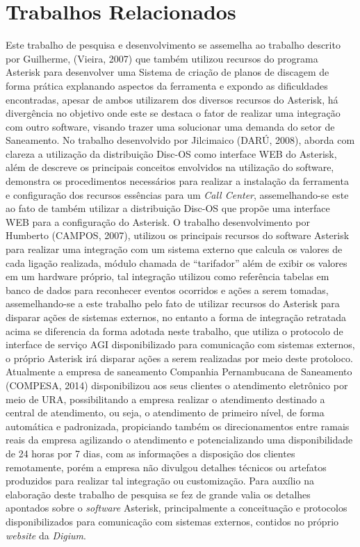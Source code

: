 \section{Trabalhos Relacionados}
Este trabalho de pesquisa e desenvolvimento se assemelha ao trabalho descrito por Guilherme, (Vieira, 2007) que também utilizou recursos do programa Asterisk para desenvolver uma Sistema de criação de planos de discagem de forma prática explanando aspectos da ferramenta e expondo as dificuldades encontradas, apesar de ambos utilizarem dos diversos recursos do Asterisk, há divergência no objetivo onde este se destaca o fator de realizar uma integração com outro software, visando trazer uma solucionar uma demanda do setor de Saneamento.  No trabalho desenvolvido por Jilcimaico (DARÚ, 2008), aborda com clareza a utilização da distribuição Disc-OS como interface WEB do Asterisk, além de descreve os principais conceitos envolvidos na utilização do software, demonstra os procedimentos necessários para realizar a instalação da ferramenta e configuração dos recursos essências para um \textit{Call Center}, assemelhando-se este ao fato de também utilizar a distribuição Disc-OS que propõe uma interface WEB para a configuração do Asterisk.
O trabalho desenvolvimento por Humberto (CAMPOS, 2007), utilizou os principais recursos do software Asterisk para realizar uma integração com um sistema externo que calcula os valores de cada ligação realizada, módulo chamada de “tarifador” além de exibir os valores em um hardware próprio, tal integração utilizou como referência tabelas em banco de dados para reconhecer eventos ocorridos e ações a serem tomadas, assemelhando-se a este trabalho pelo fato de utilizar recursos do Asterisk para disparar ações de sistemas externos, no entanto a forma de integração retratada acima se diferencia da forma adotada neste trabalho, que utiliza o protocolo de interface de serviço AGI disponibilizado para comunicação com sistemas externos, o próprio Asterisk irá disparar ações a serem realizadas por meio deste protoloco.
Atualmente a empresa de saneamento Companhia Pernambucana de Saneamento (COMPESA, 2014) disponibilizou aos seus clientes o atendimento eletrônico por meio de URA, possibilitando a empresa realizar o atendimento destinado a central de atendimento, ou seja, o atendimento de primeiro nível, de forma automática e padronizada, propiciando também os direcionamentos entre ramais reais da empresa agilizando o atendimento e potencializando uma disponibilidade de 24 horas por 7 dias, com as informações a disposição dos clientes remotamente, porém a empresa não divulgou detalhes técnicos ou artefatos produzidos para realizar tal integração ou customização.
Para auxílio na elaboração deste trabalho de pesquisa se fez de grande valia os detalhes apontados sobre o \textit{software} Asterisk, principalmente a conceituação e protocolos disponibilizados para comunicação com sistemas externos, contidos no próprio \textit{website} da \textit{Digium}. 
